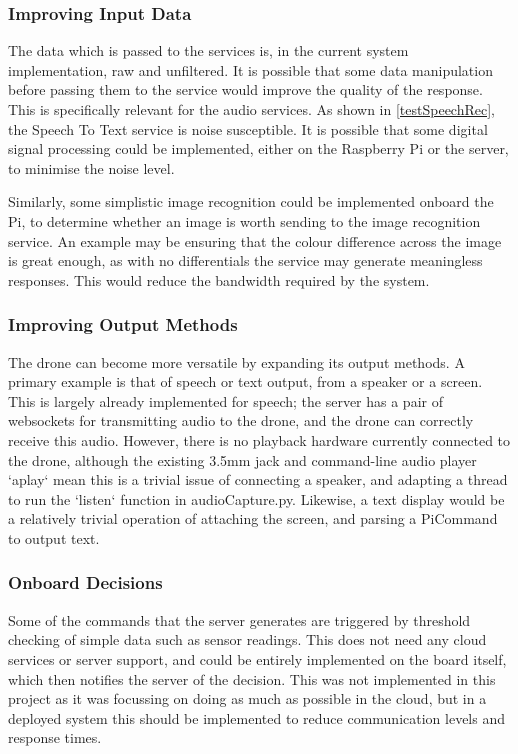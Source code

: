 \documentclass{article}
\begin{document}
\subsubsection{Improving Input Data}
The data which is passed to the services is, in the current system implementation, raw and unfiltered. It is possible that some data manipulation before passing them to the service would improve the quality of the response. This is specifically relevant for the audio services. As shown in \ref{testSpeechRec}, the Speech To Text service is noise susceptible. It is possible that some digital signal processing could be implemented, either on the Raspberry Pi or the server, to minimise the noise level.

Similarly, some simplistic image recognition could be implemented onboard the Pi, to determine whether an image is worth sending to the image recognition service. An example may be ensuring that the colour difference across the image is great enough, as with no differentials the service may generate meaningless responses. This would reduce the bandwidth required by the system.

\subsubsection{Improving Output Methods} \label{OutputMethods}
The drone can become more versatile by expanding its output methods. A primary example is that of speech or text output, from a speaker or a screen. This is largely already implemented for speech; the server has a pair of websockets for transmitting audio to the drone, and the drone can correctly receive this audio. However, there is no playback hardware currently connected to the drone, although the existing 3.5mm jack and command-line audio player `aplay` mean this is a trivial issue of connecting a speaker, and adapting a thread to run the `listen` function in audioCapture.py. Likewise, a text display would be a relatively trivial operation of attaching the screen, and parsing a PiCommand to output text. 

\subsubsection{Onboard Decisions}
Some of the commands that the server generates are triggered by threshold checking of simple data such as sensor readings. This does not need any cloud services or server support, and could be entirely implemented on the board itself, which then notifies the server of the decision. This was not implemented in this project as it was focussing on doing as much as possible in the cloud, but in a deployed system this should be implemented to reduce communication levels and response times. 
\end{document}
